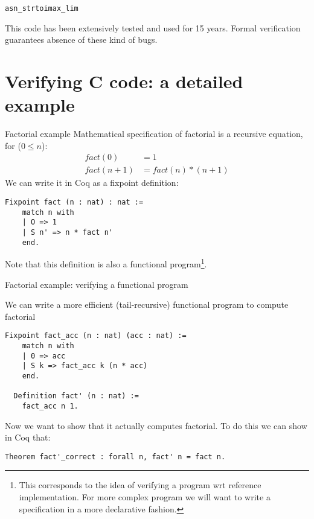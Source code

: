 \documentclass[10pt]{beamer}
\begin{document}
\begin{frame}{\texttt{asn\_strtoimax\_lim}}

This code has been extensively tested and used for 15 years. Formal verification guarantees absence of these kind of bugs. 

\end{frame}

\section{Verifying C code: a detailed example}


\begin{frame}[fragile]{Factorial example}
  Mathematical specification of factorial is a recursive equation, for ($0 \leq n$):
  \begin{align*}
  fact(0) &= 1 \\
  fact(n + 1) &= fact(n)*(n+1)    
  \end{align*}
  We can write it in Coq as a fixpoint definition:
  \begin{lstlisting}[language=Coq]
  Fixpoint fact (n : nat) : nat :=
    match n with
    | O => 1
    | S n' => n * fact n'
    end.
  \end{lstlisting}
  Note that this definition is also a functional program\footnote{This corresponds to the idea of verifying a program wrt reference implementation. For more complex program we will want to write a specification in a more declarative fashion.}.
 
\end{frame}



\begin{frame}[fragile]{Factorial example: verifying a functional program}

  We can write a more efficient (tail-recursive) functional program to compute factorial

  \begin{lstlisting}[language=Coq]
  Fixpoint fact_acc (n : nat) (acc : nat) :=
    match n with
    | 0 => acc
    | S k => fact_acc k (n * acc)
    end.

  Definition fact' (n : nat) :=
    fact_acc n 1.

  \end{lstlisting}

  Now we want to show that it actually computes factorial. To do this we can show in Coq that:
   \begin{lstlisting}[language=Coq]
  Theorem fact'_correct : forall n, fact' n = fact n.
  \end{lstlisting}

   
\end{frame}
\end{document}
